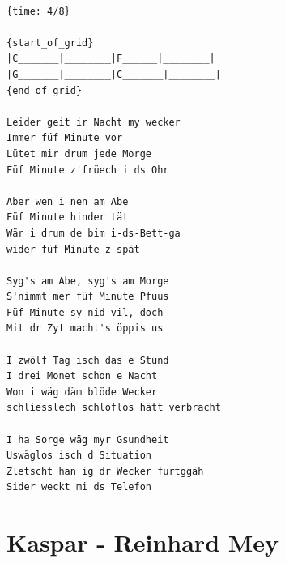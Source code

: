 \documentclass[]{book}
\let\stdsection\section
\renewcommand\section{\clearpage\stdsection}
\begin{document}
\begin{verbatim}

{time: 4/8}

{start_of_grid}
|C_______|________|F______|________|
|G_______|________|C_______|________|
{end_of_grid}

Leider geit ir Nacht my wecker
Immer füf Minute vor
Lütet mir drum jede Morge
Füf Minute z'früech i ds Ohr

Aber wen i nen am Abe
Füf Minute hinder tät
Wär i drum de bim i-ds-Bett-ga
wider füf Minute z spät

Syg's am Abe, syg's am Morge
S'nimmt mer füf Minute Pfuus
Füf Minute sy nid vil, doch
Mit dr Zyt macht's öppis us

I zwölf Tag isch das e Stund
I drei Monet schon e Nacht
Won i wäg däm blöde Wecker
schliesslech schloflos hätt verbracht

I ha Sorge wäg myr Gsundheit
Uswäglos isch d Situation
Zletscht han ig dr Wecker furtggäh
Sider weckt mi ds Telefon
\end{verbatim}

\hypertarget{kaspar---reinhard-mey}{%
\section{Kaspar - Reinhard Mey}\label{kaspar---reinhard-mey}}
\end{document}
